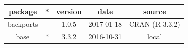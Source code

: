 \documentclass[]{article}
\begin{document}
\begin{itemize}
  \begin{longtable}[]{@{}ccccc@{}}
  \toprule
  \begin{minipage}[b]{0.13\columnwidth}\centering\strut
  package\strut
  \end{minipage} & \begin{minipage}[b]{0.05\columnwidth}\centering\strut
  *\strut
  \end{minipage} & \begin{minipage}[b]{0.13\columnwidth}\centering\strut
  version\strut
  \end{minipage} & \begin{minipage}[b]{0.13\columnwidth}\centering\strut
  date\strut
  \end{minipage} & \begin{minipage}[b]{0.29\columnwidth}\centering\strut
  source\strut
  \end{minipage}\tabularnewline
  \midrule
  \endhead
  \begin{minipage}[t]{0.13\columnwidth}\centering\strut
  backports\strut
  \end{minipage} & \begin{minipage}[t]{0.05\columnwidth}\centering\strut
  \strut
  \end{minipage} & \begin{minipage}[t]{0.13\columnwidth}\centering\strut
  1.0.5\strut
  \end{minipage} & \begin{minipage}[t]{0.13\columnwidth}\centering\strut
  2017-01-18\strut
  \end{minipage} & \begin{minipage}[t]{0.29\columnwidth}\centering\strut
  CRAN (R 3.3.2)\strut
  \end{minipage}\tabularnewline
  \begin{minipage}[t]{0.13\columnwidth}\centering\strut
  base\strut
  \end{minipage} & \begin{minipage}[t]{0.05\columnwidth}\centering\strut
  *\strut
  \end{minipage} & \begin{minipage}[t]{0.13\columnwidth}\centering\strut
  3.3.2\strut
  \end{minipage} & \begin{minipage}[t]{0.13\columnwidth}\centering\strut
  2016-10-31\strut
  \end{minipage} & \begin{minipage}[t]{0.29\columnwidth}\centering\strut
  local\strut
  \end{minipage}\tabularnewline

\end{longtable}
\end{itemize}
\end{document}
